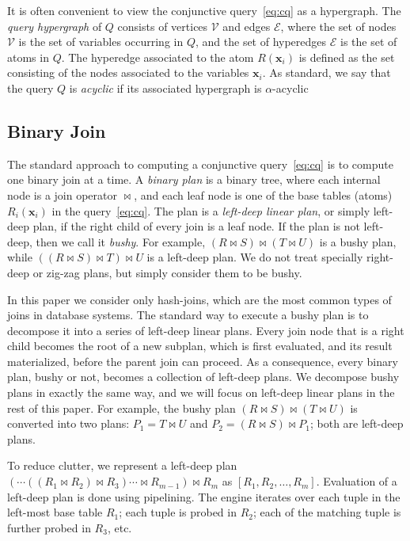 It is often convenient to view the conjunctive query~\eqref{eq:cq} as
a hypergraph.  The \emph{query hypergraph} of $Q$ consists of vertices
$\mathcal{V}$ and edges $\mathcal{E}$, where the set of nodes
$\mathcal{V}$ is the set of variables occurring in $Q$, and the set of
hyperedges $\mathcal{E}$ is the set of atoms in $Q$.  The hyperedge
associated to the atom $R(\bm x_i)$ is defined as the set consisting
of the nodes associated to the variables $\bm x_i$.  As standard, we
say that the query $Q$ is {\em acyclic} if its associated hypergraph
is $\alpha$-acyclic~\cite{DBLP:journals/jacm/Fagin83}


\subsection{Binary Join}\label{sec:binary-join}

The standard approach to computing a conjunctive query~\eqref{eq:cq} is
to compute one binary join at a time.  A {\em binary plan} is a binary
tree, where each internal node is a join operator $\Join$, and each
leaf node is one of the base tables (atoms) $R_i(\bm x_i)$ in the
query~\eqref{eq:cq}.  The plan is a \emph{left-deep linear plan}, or
simply left-deep plan, if the right child of every join is a leaf
node.  If the plan is not left-deep, then we call it \emph{bushy}.
For example, $(R \Join S) \Join (T \Join U)$ is a bushy plan, while
$((R \Join S) \Join T) \Join U$ is a left-deep plan.  We do not treat
specially right-deep or zig-zag plans, but simply consider them to be
bushy.

In this paper we consider only hash-joins, which are the most
common types of joins in database systems. 
The standard way to execute a bushy plan is to
decompose it into a series of left-deep linear plans.  Every join node
that is a right child becomes the root of a new subplan, which is
first evaluated, and its result materialized, before the parent join
can proceed.  As a consequence, every binary plan, bushy or not,
becomes a collection of left-deep plans. We decompose bushy
plans in exactly the same way, and we will focus on left-deep linear
plans in the rest of this paper.  For example, the bushy plan
$(R \Join S) \Join (T \Join U)$ is converted into two plans:
$P_1 = T \Join U$ and $P_2 = (R \Join S) \Join P_1$; both are
left-deep plans.

To reduce clutter, we represent a left-deep plan
$(\cdots ((R_1 \Join R_2) \Join R_3) \cdots \Join R_{m-1}) \Join R_m$
as $[R_1, R_2, \ldots, R_m]$.  Evaluation of a left-deep plan is done
using pipelining.  The engine iterates over each tuple in the
left-most base table $R_1$; each tuple is probed in $R_2$; each of the
matching tuple is further probed in $R_3$, etc.


